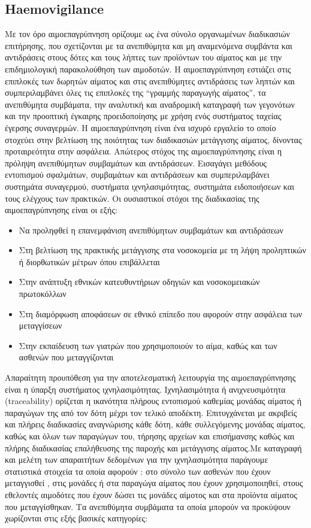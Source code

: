 	\subsection{Haemovigilance}
Με τον όρο αιμοεπαγρύπνηση ορίζουμε ως ένα σύνολο οργανωμένων διαδικασιών επιτήρησης, που σχετίζονται με τα ανεπιθύμητα και μη αναμενόμενα συμβάντα και αντιδράσεις στους δότες και τους λήπτες των προϊόντων του αίματος και με την επιδημιολογική παρακολούθηση των αιμοδοτών. Η αιμοεπαγρύπνηση εστιάζει στις  επιπλοκές των δωρητών αίματος και στις ανεπιθύμητες αντιδράσεις των ληπτών και συμπεριλαμβάνει όλες τις επιπλοκές της “γραμμής παραγωγής αίματος”, τα ανεπιθύμητα συμβάματα, την αναλυτική και αναδρομική καταγραφή των γεγονότων και την προοπτική έγκαιρης προειδοποίησης με χρήση ενός συστήματος ταχείας έγερσης συναγερμών. Η αιμοεπαγρύπνηση είναι ένα ισχυρό εργαλείο το οποίο στοχεύει στην βελτίωση της ποιότητας των διαδικασιών μετάγγισης αίματος, δίνοντας προταιρεότητα στην ασφάλεια. Απώτερος στόχος της αιμοεπαγρύπνησης είναι η πρόληψη ανεπιθύμητων συμβαμάτων και αντιδράσεων. Εισαγάγει μεθόδους εντοπισμού σφαλμάτων, συμβαμάτων και αντιδράσεων και συμπεριλαμβάνει συστημάτα συναγερμού, συστήματα ιχνηλασιμότητας, συστημάτα ειδοποιήσεων και τους ελέγχους των πρακτικών.
		Οι ουσιαστικοί στόχοι της διαδικασίας της αιμοεπαγρύπνησης είναι οι εξής:
		\begin{itemize}
		\item Να προληφθεί η επανεμφάνιση ανεπιθύμητων συμβαμάτων και αντιδράσεων 
		\item Στη βελτίωση της πρακτικής μετάγγισης στα νοσοκομεία με τη λήψη προληπτικών ή διορθωτικών μέτρων όπου επιβάλλεται 
		\item Στην ανάπτυξη εθνικών κατευθυντήριων οδηγιών και νοσοκομειακών πρωτοκόλλων 
		\item Στη διαμόρφωση αποφάσεων σε εθνικό επίπεδο που αφορούν στην ασφάλεια των μεταγγίσεων 
		\item Στην εκπαίδευση των γιατρών που χρησιμοποιούν το αίμα, καθώς και των ασθενών που μεταγγίζονται 
		\end{itemize}

		Απαραίτητη προυπόθεση για την αποτελεσματική λειτουργία της αιμοεπαγρύπνησης είναι η 	ύπαρξη συστήματος ιχνηλασιμότητας. Ιχνηλασιμότητα ή ανιχνευσιμότητα (traceability) ορίζεται η ικανότητα πλήρους εντοπισμού καθεμίας μονάδας αίματος ή παραγώγων   		της από τον δότη μέχρι τον τελικό αποδέκτη. Επιτυγχάνεται  με ακριβείς και πλήρεις διαδικασίες αναγνώρισης κάθε δότη, κάθε συλλεγόμενης μονάδας αίματος, καθώς και όλων των παραγώγων του, τήρησης αρχείων και επισήμανσης καθώς και πλήρης διαδικασίας επαλήθευσης της παροχής και μετάγγισης αίματος.Με καταγραφή και μελέτη των απαραιτήτων  δεδομένων για την ιχνηλασιμότητα παράγουμε στατιστικά στοιχεία τα οποία αφορούν : στο  σύνολο των ασθενών που έχουν μεταγγισθεί , στις μονάδες ή στα παραγώγα αίματος που  έχουν χρησιμοποιηθεί, στους εθελοντές αιμοδότες που έχουν δώσει τις μονάδες αίμοτος και στα προϊόντα αίματος που μεταγγίσθηκαν. 
		Τα ανεπιθύμητα συμβάματα τα οποία μπορούν να προκύψουν χωρίζονται στις εξής βασικές 	κατηγορίες:
	
